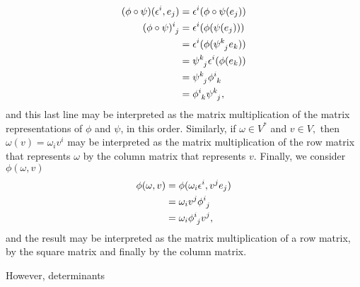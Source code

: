 \begin{remark}
    \begin{align*}
        (\phi\circ\psi)(\epsilon^i, e_j) &= \epsilon^i(\phi\circ\psi(e_j))\\
        (\phi \circ \psi)\indices{^i_j} &= \epsilon^i(\phi(\psi(e_j)))\\
                                         &= \epsilon^i(\phi(\psi\indices{^k_j}e_k))\\
                                         &= \psi\indices{^k_j}\epsilon^i(\phi(e_k))\\
                                         &= \psi\indices{^k_j}\phi\indices{^i_k}\\
                                         &= \phi\indices{^i_k}\psi\indices{^k_j},
    \end{align*}
    and this last line may be interpreted as the matrix multiplication of the matrix representations of \(\phi\) and \(\psi\), in this order. Similarly, if \(\omega \in V ^{\ast}\) and \(v \in V,\) then \(\omega(v) = \omega_i v^i\) may be interpreted as the matrix multiplication of the row matrix that represents \(\omega\) by the column matrix that represents \(v\). Finally, we consider \(\phi(\omega, v)\)
    \begin{align*}
        \phi(\omega, v) &= \phi(\omega_i \epsilon^i, v^je_j)\\
                        &= \omega_i v^j \phi\indices{^i_j}\\
                        &= \omega_i \phi\indices{^i_j} v^j,
    \end{align*}
    and the result may be interpreted as the matrix multiplication of a row matrix, by the square matrix and finally by the column matrix.

    However, determinants \todo
\end{remark}
